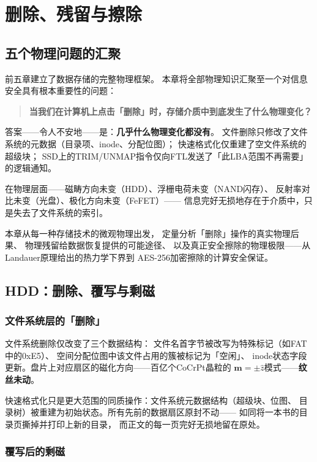 \documentclass[11pt,a4paper,openany]{book}
\theoremstyle{definition}
\theoremstyle{plain}
\theoremstyle{remark}
\begin{document}
\chapter{删除、残留与擦除}
\label{ch:deletion}

\section{五个物理问题的汇聚}

前五章建立了数据存储的完整物理框架。
本章将全部物理知识汇聚至一个对信息安全具有根本重要性的问题：

\begin{quote}
\textbf{当我们在计算机上点击「删除」时，存储介质中到底发生了什么物理变化？}
\end{quote}

答案——令人不安地——是：\textbf{几乎什么物理变化都没有}。
文件删除只修改了文件系统的元数据（目录项、inode、分配位图）；
快速格式化仅重建了空文件系统的超级块；
SSD上的TRIM/UNMAP指令仅向FTL发送了「此LBA范围不再需要」的逻辑通知。

在物理层面——磁畴方向未变（HDD）、浮栅电荷未变（NAND闪存）、
反射率对比未变（光盘）、极化方向未变（FeFET）——
信息完好无损地存在于介质中，只是失去了文件系统的索引。

本章从每一种存储技术的微观物理出发，
定量分析「删除」操作的真实物理后果、
物理残留给数据恢复提供的可能途径、
以及真正安全擦除的物理极限——从Landauer原理给出的热力学下界到
AES-256加密擦除的计算安全保证。

\section{HDD：删除、覆写与剩磁}

\subsection{文件系统层的「删除」}

文件系统删除仅改变了三个数据结构：
文件名首字节被改写为特殊标记（如FAT中的0xE5）、
空间分配位图中该文件占用的簇被标记为「空闲」、
inode状态字段更新。盘片上对应扇区的磁化方向——百亿个CoCrPt晶粒的
$\mathbf{m} = \pm\hat{z}$模式——\textbf{纹丝未动}。

快速格式化只是更大范围的同质操作：文件系统元数据结构（超级块、位图、
目录树）被重建为初始状态。所有先前的数据扇区原封不动——
如同将一本书的目录页撕掉并打印上新的目录，
而正文的每一页完好无损地留在原处。

\subsection{覆写后的剩磁}
\end{document}
